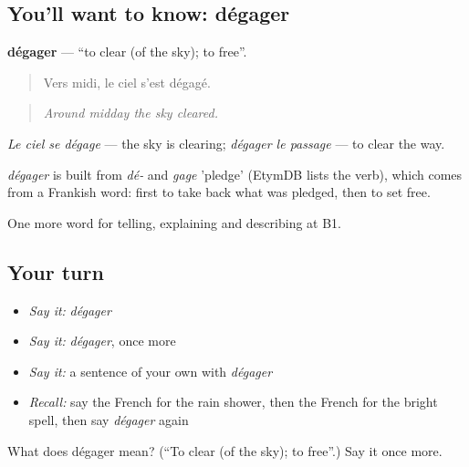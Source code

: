 \subsection*{You'll want to know: dégager}
\textbf{dégager} — \textquotedblleft{}to clear (of the sky); to free\textquotedblright{}.

\begin{quote}
Vers midi, le ciel s'est dégagé.
\end{quote}

\begin{quote}
\emph{Around midday the sky cleared.}
\end{quote}

\emph{Le ciel se dégage} — the sky is clearing; \emph{dégager le passage} — to clear the way.

\begin{cousinweb}
\emph{dégager} is built from \emph{dé-} and \emph{gage} 'pledge' (EtymDB lists the verb), which comes from a Frankish word: first to take back what was pledged, then to set free.
\end{cousinweb}

\begin{grammarlens}[title={What you've built}]
One more word for telling, explaining and describing at B1.
\end{grammarlens}

\subsection*{Your turn}
\begin{itemize}
\raggedright
  \item \emph{Say it:} \emph{dégager}
  \item \emph{Say it:} \emph{dégager}, once more
  \item \emph{Say it:} a sentence of your own with \emph{dégager}
  \item \emph{Recall:} say the French for the rain shower, then the French for the bright spell, then say \emph{dégager} again
\end{itemize}

\begin{tcolorbox}[breakable,colback=teal!4,colframe=teal!35!black,title={Before you move on}]
What does dégager mean? (\textquotedblleft{}To clear (of the sky); to free\textquotedblright{}.) Say it once more.
\end{tcolorbox}
